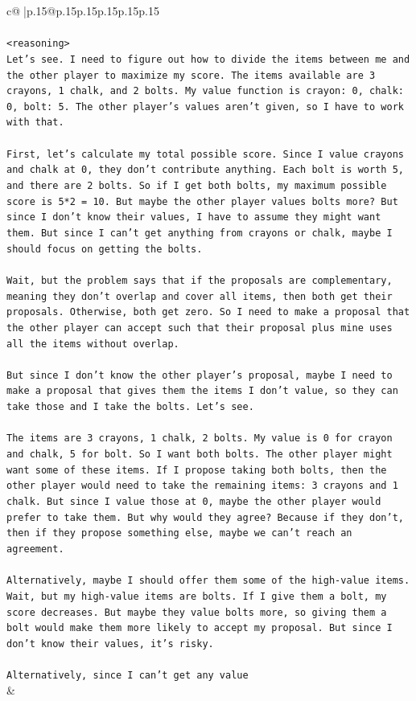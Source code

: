 \documentclass{article}
\begin{document}
{\begin{supertabular}{c@{$\;$}|p{.15\linewidth}@{}p{.15\linewidth}p{.15\linewidth}p{.15\linewidth}p{.15\linewidth}p{.15\linewidth}}
{{{\\ 
\\ 
\texttt{<reasoning>} \\
\texttt{Let's see. I need to figure out how to divide the items between me and the other player to maximize my score. The items available are 3 crayons, 1 chalk, and 2 bolts. My value function is crayon: 0, chalk: 0, bolt: 5. The other player's values aren't given, so I have to work with that.} \\
\\ 
\texttt{First, let's calculate my total possible score. Since I value crayons and chalk at 0, they don't contribute anything. Each bolt is worth 5, and there are 2 bolts. So if I get both bolts, my maximum possible score is 5*2 = 10. But maybe the other player values bolts more? But since I don't know their values, I have to assume they might want them. But since I can't get anything from crayons or chalk, maybe I should focus on getting the bolts.} \\
\\ 
\texttt{Wait, but the problem says that if the proposals are complementary, meaning they don't overlap and cover all items, then both get their proposals. Otherwise, both get zero. So I need to make a proposal that the other player can accept such that their proposal plus mine uses all the items without overlap.} \\
\\ 
\texttt{But since I don't know the other player's proposal, maybe I need to make a proposal that gives them the items I don't value, so they can take those and I take the bolts. Let's see.} \\
\\ 
\texttt{The items are 3 crayons, 1 chalk, 2 bolts. My value is 0 for crayon and chalk, 5 for bolt. So I want both bolts. The other player might want some of these items. If I propose taking both bolts, then the other player would need to take the remaining items: 3 crayons and 1 chalk. But since I value those at 0, maybe the other player would prefer to take them. But why would they agree? Because if they don't, then if they propose something else, maybe we can't reach an agreement.} \\
\\ 
\texttt{Alternatively, maybe I should offer them some of the high{-}value items. Wait, but my high{-}value items are bolts. If I give them a bolt, my score decreases. But maybe they value bolts more, so giving them a bolt would make them more likely to accept my proposal. But since I don't know their values, it's risky.} \\
\\ 
\texttt{Alternatively, since I can't get any value} \\
            }
        }
    }
    & \\ \\


\end{supertabular}}
\end{document}

